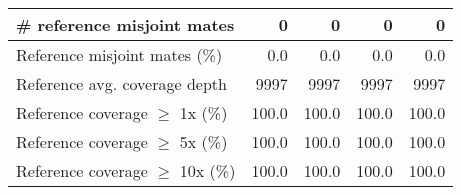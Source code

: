 \documentclass[12pt,a4paper]{article}
\begin{document}
\begin{table}[ht]
\begin{center}
\begin{tabular}{|l*{4}{|r}|}
\# reference misjoint mates & 0 & 0 & 0 & 0 \\ \hline
Reference misjoint mates (\%) & 0.0 & 0.0 & 0.0 & 0.0 \\ \hline
Reference avg. coverage depth & 9997 & 9997 & 9997 & 9997 \\ \hline
Reference coverage $\geq$ 1x (\%) & 100.0 & 100.0 & 100.0 & 100.0 \\ \hline
Reference coverage $\geq$ 5x (\%) & 100.0 & 100.0 & 100.0 & 100.0 \\ \hline
Reference coverage $\geq$ 10x (\%) & 100.0 & 100.0 & 100.0 & 100.0 \\ \hline
\end{tabular}
\end{center}
\end{table}
\end{document}
